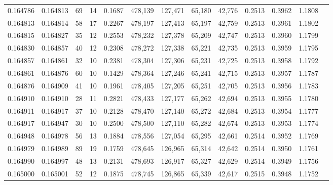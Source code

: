 \begin{tabular}{rrrrrrrrrrrrr}
0.164786 & 0.164813 &    69 &  14 &                                     0.1687 & 478,139 & 127,471 &  65,180 &  42,776 & 0.2513 & 0.3962 & 1.1808 \\
0.164813 & 0.164814 &    58 &  17 &                                     0.2267 & 478,197 & 127,413 &  65,197 &  42,759 & 0.2513 & 0.3961 & 1.1802 \\
0.164815 & 0.164827 &    35 &  12 &                                     0.2553 & 478,232 & 127,378 &  65,209 &  42,747 & 0.2513 & 0.3960 & 1.1799 \\
0.164830 & 0.164857 &    40 &  12 &                                     0.2308 & 478,272 & 127,338 &  65,221 &  42,735 & 0.2513 & 0.3959 & 1.1795 \\
0.164857 & 0.164861 &    32 &  10 &                                     0.2381 & 478,304 & 127,306 &  65,231 &  42,725 & 0.2513 & 0.3958 & 1.1792 \\
0.164861 & 0.164876 &    60 &  10 &                                     0.1429 & 478,364 & 127,246 &  65,241 &  42,715 & 0.2513 & 0.3957 & 1.1787 \\
0.164876 & 0.164909 &    41 &  10 &                                     0.1961 & 478,405 & 127,205 &  65,251 &  42,705 & 0.2513 & 0.3956 & 1.1783 \\
0.164910 & 0.164910 &    28 &  11 &                                     0.2821 & 478,433 & 127,177 &  65,262 &  42,694 & 0.2513 & 0.3955 & 1.1780 \\
0.164911 & 0.164917 &    37 &  10 &                                     0.2128 & 478,470 & 127,140 &  65,272 &  42,684 & 0.2513 & 0.3954 & 1.1777 \\
0.164917 & 0.164947 &    30 &  10 &                                     0.2500 & 478,500 & 127,110 &  65,282 &  42,674 & 0.2513 & 0.3953 & 1.1774 \\
0.164948 & 0.164978 &    56 &  13 &                                     0.1884 & 478,556 & 127,054 &  65,295 &  42,661 & 0.2514 & 0.3952 & 1.1769 \\
0.164979 & 0.164989 &    89 &  19 &                                     0.1759 & 478,645 & 126,965 &  65,314 &  42,642 & 0.2514 & 0.3950 & 1.1761 \\
0.164990 & 0.164997 &    48 &  13 &                                     0.2131 & 478,693 & 126,917 &  65,327 &  42,629 & 0.2514 & 0.3949 & 1.1756 \\
0.165000 & 0.165001 &    52 &  12 &                                     0.1875 & 478,745 & 126,865 &  65,339 &  42,617 & 0.2515 & 0.3948 & 1.1752 \\

\end{tabular}
